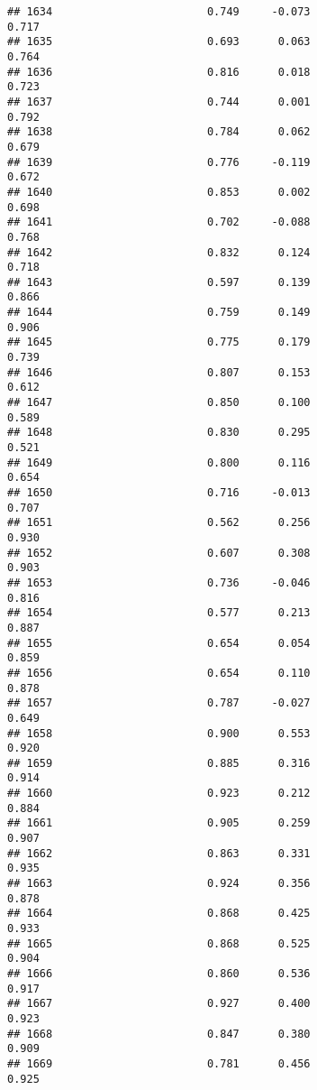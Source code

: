 \documentclass[
]{article}
\begin{document}
\begin{verbatim}
## 1634                        0.749     -0.073                     0.717
## 1635                        0.693      0.063                     0.764
## 1636                        0.816      0.018                     0.723
## 1637                        0.744      0.001                     0.792
## 1638                        0.784      0.062                     0.679
## 1639                        0.776     -0.119                     0.672
## 1640                        0.853      0.002                     0.698
## 1641                        0.702     -0.088                     0.768
## 1642                        0.832      0.124                     0.718
## 1643                        0.597      0.139                     0.866
## 1644                        0.759      0.149                     0.906
## 1645                        0.775      0.179                     0.739
## 1646                        0.807      0.153                     0.612
## 1647                        0.850      0.100                     0.589
## 1648                        0.830      0.295                     0.521
## 1649                        0.800      0.116                     0.654
## 1650                        0.716     -0.013                     0.707
## 1651                        0.562      0.256                     0.930
## 1652                        0.607      0.308                     0.903
## 1653                        0.736     -0.046                     0.816
## 1654                        0.577      0.213                     0.887
## 1655                        0.654      0.054                     0.859
## 1656                        0.654      0.110                     0.878
## 1657                        0.787     -0.027                     0.649
## 1658                        0.900      0.553                     0.920
## 1659                        0.885      0.316                     0.914
## 1660                        0.923      0.212                     0.884
## 1661                        0.905      0.259                     0.907
## 1662                        0.863      0.331                     0.935
## 1663                        0.924      0.356                     0.878
## 1664                        0.868      0.425                     0.933
## 1665                        0.868      0.525                     0.904
## 1666                        0.860      0.536                     0.917
## 1667                        0.927      0.400                     0.923
## 1668                        0.847      0.380                     0.909
## 1669                        0.781      0.456                     0.925

\end{verbatim}
\end{document}
